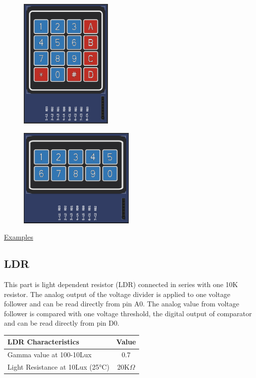 \begin{figure}[H]
\center
\includegraphics[width=0.4\textwidth]{img/part_keyb_4x4.png} 
\end{figure} 

\begin{figure}[H]
\center
\includegraphics[width=0.5\textwidth]{img/part_keyb_2x5.png} 
\end{figure} 

\href{https://lcgamboa.github.io/picsimlab_examples/parts_Keypad.html}{Examples}


\subsection{LDR}

This part is light dependent resistor (LDR) connected in series with one 10K resistor.
The analog output of the voltage divider is applied to one voltage follower and can be 
read directly from pin A0.
The analog value from voltage follower is compared with one voltage threshold, the digital 
output of comparator and can be read directly from pin D0.

\begin{center}
\begin{tabular}{l|c}
\hline LDR Characteristics  & Value \\
\hline 
\hline Gamma value at 100-10Lux       &       0.7\\
\hline Light Resistance at 10Lux (25°C) &     20K$\Omega$\\
\hline 
\end{tabular}
\end{center}


